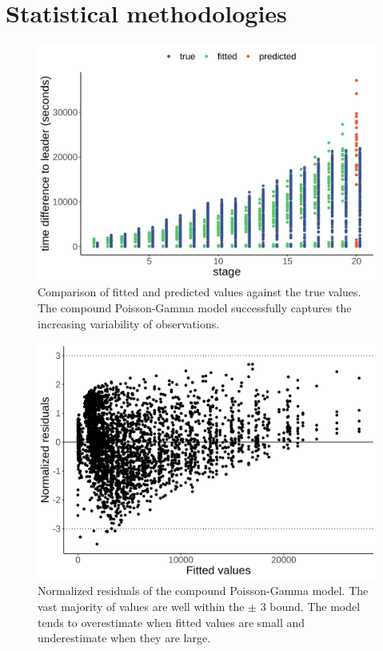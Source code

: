 \documentclass[aos,preprint]{imsart}
\begin{document}
\section{Statistical methodologies} \label{sec:stats}



\begin{figure}[h]
  \centering
  \includegraphics[scale=0.65]{fig/fitted_predicted.png}
  \caption{Comparison of fitted and predicted values against the true values. The compound Poisson-Gamma model successfully captures the increasing variability of observations.}
  \label{fig:fitted_predicted}
\end{figure}


\begin{figure}[h]
  \centering
  \includegraphics[scale=0.65]{fig/norm_res.png}
  \caption{Normalized residuals of the compound Poisson-Gamma model. The vast majority of values are well within the $\pm$ 3 bound. The model tends to overestimate when fitted values are small and underestimate when they are large.}
  \label{fig:norm_res}
\end{figure}
\end{document}
